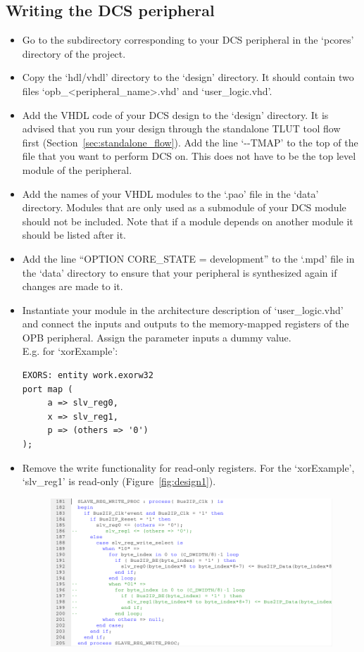 \documentclass[a4paper,oneside]{memoir}
\begin{document}
\subsection{Writing the DCS peripheral}\label{sec:writing_peripheral}
\begin{itemize}
\item Go to the subdirectory corresponding to your DCS peripheral in the `pcores' directory of the project.
\item Copy the `hdl/vhdl' directory to the `design' directory. It should contain two files `opb\_<peripheral\_name>.vhd' and `user\_logic.vhd'.
\item Add the VHDL code of your DCS design to the `design' directory. It is advised that you run your design through the standalone TLUT tool flow first (Section\ \ref{sec:standalone_flow}). Add the line `-\--TMAP' to the top of the file that you want to perform DCS on. This does not have to be the top level module of the peripheral.
\item Add the names of your VHDL modules to the `.pao' file in the `data' directory. Modules that are only used as a submodule of your DCS module should not be included. Note that if a module depends on another module it should be listed after it.
\item Add the line ``OPTION CORE\_STATE = development'' to the `.mpd' file in the `data' directory to ensure that your peripheral is synthesized again if changes are made to it.
\item Instantiate your module in the architecture description of `user\_logic.vhd' and connect the inputs and outputs to the memory-mapped registers of the OPB peripheral. Assign the parameter inputs a dummy value.\\
E.g. for  `xorExample':
\lstset{language=VHDL}
\begin{lstlisting}
EXORS: entity work.exorw32
port map (
     a => slv_reg0,
     x => slv_reg1,
     p => (others => '0')
);
\end{lstlisting}
\item Remove the write functionality for read-only registers. For the `xorExample',  `slv\_reg1' is read-only (Figure~\ref{fig:design1}).
\begin{figure}[H]
\centering
\includegraphics[scale=0.5]{design1}

\end{figure}
\end{itemize}
\end{document}
